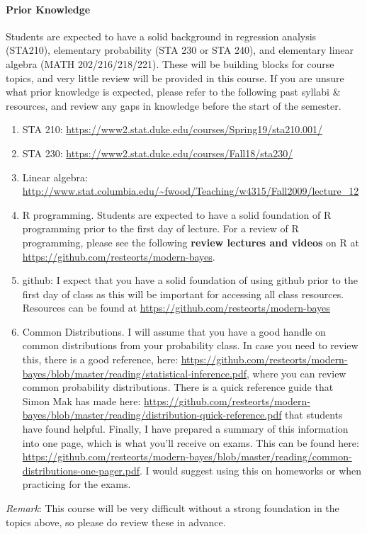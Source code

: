 \documentclass[11pt]{article}
\begin{document}
\paragraph{Prior Knowledge}
Students are expected to have a solid background in regression analysis (STA210), elementary probability (STA 230 or STA 240), and elementary linear algebra (MATH 202/216/218/221). These will be building blocks for course topics, and very little review will be provided in this course.  If you are unsure what prior knowledge is expected, please refer to the following past syllabi \& resources, and review any gaps in knowledge before the start of the semester. 
\begin{enumerate}
\item STA 210: \url{https://www2.stat.duke.edu/courses/Spring19/sta210.001/}
\item STA 230: \url{https://www2.stat.duke.edu/courses/Fall18/sta230/}
\item Linear algebra: \url{http://www.stat.columbia.edu/~fwood/Teaching/w4315/Fall2009/lecture_12}
\item R programming. Students are expected to have a solid foundation of R programming prior to the first day of lecture. For a review of R programming, please see the following \textbf{review lectures and videos} on R at \url{https://github.com/resteorts/modern-bayes}.
\item github: I expect that you have a solid foundation of using github prior to the first day of class as this will be important for accessing all class resources.  Resources can be found at \url{https://github.com/resteorts/modern-bayes}
\item Common Distributions. I will assume that you have a good handle on common distributions from your probability class. In case you need to review this, there is a good reference, here: \url{https://github.com/resteorts/modern-bayes/blob/master/reading/statistical-inference.pdf}, where you can review common probability distributions. There is a quick reference guide that Simon Mak has made here: \url{https://github.com/resteorts/modern-bayes/blob/master/reading/distribution-quick-reference.pdf} that students have found helpful. Finally, I have prepared a summary of this information into one page, which is what you'll receive on exams. This can be found here: \url{https://github.com/resteorts/modern-bayes/blob/master/reading/common-distributions-one-pager.pdf}. I would suggest using this on homeworks or when practicing for the exams. 
\end{enumerate}
\emph{Remark}: This course will be very difficult without a strong foundation in the topics above, so please do review these in advance. 
\end{document}
